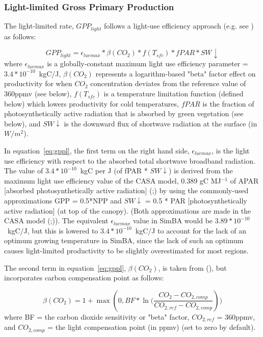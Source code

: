 \subsubsection{Light-limited Gross Primary Production}

The light-limited rate, $GPP_{light}$ follows a light-use efficiency approach (e.g. see \cite{yuan2007}) as follows:

\begin{equation}
\label{eq:gppl}
GPP_{light} = \epsilon_{luemax} * \beta(CO_{2}) * f(T_{sfc}) * fPAR * SW\downarrow
\end{equation}
where $\epsilon_{luemax}$ is a globally-constant maximum light use efficiency parameter = $3.4*10^{-10}$~kgC/J,
$\beta(CO_{2})$ represents a logarithm-based "beta" factor effect on productivity for when $CO_2$ concentration deviates from the reference value of 360ppmv (see below),
$f(T_{sfc})$ is a temperature limitation function (defined below) which lowers productivity for cold temperatures, 
$fPAR$ is the fraction of photosynthetically active radiation that is absorbed by green vegetation (see below), and $SW\downarrow$ is the downward flux of shortwave radiation at the surface (in $W/{m^2}$).

In equation~\eqref{eq:gppl}, the first term on the right hand side, $\epsilon_{luemax}$, is the light use efficiency with respect to the absorbed total shortwave broadband radiation.  The value of $3.4*10^{-10}$~kgC per J (of fPAR * $SW\downarrow$) is derived from the maximum light use efficiency value of the CASA model, 0.389 gC MJ$^{-1}$ of APAR [absorbed photosynthetically active radiation] (\cite{potter1993};\cite{field1995}) by using the commonly-used approximations GPP = 0.5*NPP and $SW\downarrow$ = 0.5 * PAR [photosynthetically active radiation] (at top of the canopy).  (Both approximations are made in the CASA model (\cite{potter1993};\cite{field1995})).  The equivalent $\epsilon_{luemax}$ value in SimBA would be $3.89*10^{-10}$~kgC/J, but this is lowered to $3.4*10^{-10}$~kgC/J to account for the lack of an optimum growing temperature in SimBA, since the lack of such an optimum causes light-limited productivity to be slightly overestimated for most regions.

The second term in equation~\eqref{eq:gppl}, $\beta(CO_{2})$, is taken from (\cite{harvey1989}), but incorporates carbon compensation point as follows:

\begin{equation}
\label{eq:betafactor}
\beta(CO_{2}) = 1 + \max{(0,BF * \ln{(\frac{CO_{2}-CO_{2,comp}}{CO_{2,ref}-CO_{2,comp}}}))}
\end{equation}
where BF = the carbon dioxide sensitivity or "beta" factor, $CO_{2,ref}$ = 360ppmv, and $CO_{2,comp}$ = the light compensation point (in ppmv) (set to zero by default).

